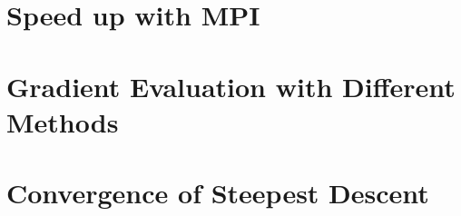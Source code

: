 \documentclass[10pt,a4paper]{report}
\begin{document}
\section{Speed up with MPI}
\section{Gradient Evaluation with Different Methods}
\section{Convergence of Steepest Descent}




\end{document}
